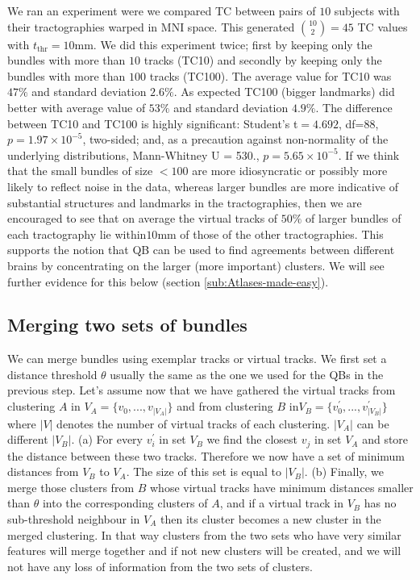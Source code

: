 \documentclass[preprint,authoryear,a4paper,10pt,onecolumn]{elsarticle}
\begin{document}
We ran an experiment were we compared TC between pairs of $10$ subjects
with their tractographies warped in MNI space. This generated
$\binom{10}{2}=45$ TC values with $t_{\textrm{thr}}=$$10$mm. We did this
experiment twice; first by keeping only the bundles with more than $10$
tracks (TC10) and secondly by keeping only the bundles with more than
$100$ tracks (TC100). The average value for TC10 was $47\%$ and standard
deviation $2.6\%$. As expected TC100 (bigger landmarks) did better with
average value of $53\%$ and standard deviation $4.9\%$. The difference
between TC10 and TC100 is highly significant: Student's t$=4.692$,
df=88, $p=1.97\times10^{-5}$, two-sided; and, as a precaution against
non-normality of the underlying distributions, Mann-Whitney U = 530.,
$p=5.65\times10^{-5}$. If we think that the small bundles of size $<100$
are more idiosyncratic or possibly more likely to reflect noise in the
data, whereas larger bundles are more indicative of substantial
structures and landmarks in the tractographies, then we are encouraged
to see that on average the virtual tracks of $50\%$ of larger bundles of
each tractography lie within$10$mm of those of the other
tractographies. This supports the notion that QB can be used to find
agreements between different brains by concentrating on the larger (more
important) clusters. We will see further evidence for this below
(section \ref{sub:Atlases-made-easy}).


\subsection{Merging two sets of bundles}

We can merge bundles using exemplar tracks or virtual tracks. We first
set a distance threshold $\theta$ usually the same as the one we used
for the QBs in the previous step. Let's assume now that we have gathered
the virtual tracks from clustering $A$ in
$V_{A}=\{v_{0},...,v_{|V_{A}|}\}$ and from clustering $B$
in$V_{B}=\{v_{0}^{'},...,v_{|V_{B}|}^{'}\}$ where $|V|$ denotes the
number of virtual tracks of each clustering.  $|V_{A}|$ can be different
$|V_{B}|$. (a) For every $v_{i}^{'}$ in set $V_{B}$ we find the closest
$v_{j}$ in set $V_{A}$ and store the distance between these two
tracks. Therefore we now have a set of minimum distances from $V_{B}$ to
$V_{A}$. The size of this set is equal to $|V_{B}|$. (b) Finally, we
merge those clusters from $B$ whose virtual tracks have minimum
distances smaller than $\theta$ into the corresponding clusters of $A$,
and if a virtual track in $V_{B}$ has no sub-threshold neighbour in
$V_{A}$ then its cluster becomes a new cluster in the merged
clustering. In that way clusters from the two sets who have very similar
features will merge together and if not new clusters will be created,
and we will not have any loss of information from the two sets of
clusters.
\end{document}
